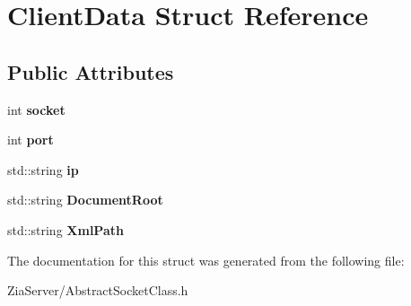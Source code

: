 \hypertarget{struct_client_data}{
\section{ClientData Struct Reference}
\label{struct_client_data}
}
\subsection*{Public Attributes}
\begin{DoxyCompactItemize}
\item 
\hypertarget{struct_client_data_a23b2f90a351ac93b2a3ee559aadc8b9f}{
int {\bfseries socket}}
\label{struct_client_data_a23b2f90a351ac93b2a3ee559aadc8b9f}

\item 
\hypertarget{struct_client_data_a469182d11f1c996e63b47a52ebf04de4}{
int {\bfseries port}}
\label{struct_client_data_a469182d11f1c996e63b47a52ebf04de4}

\item 
\hypertarget{struct_client_data_a918292163843f45e026a74f20e11be35}{
std::string {\bfseries ip}}
\label{struct_client_data_a918292163843f45e026a74f20e11be35}

\item 
\hypertarget{struct_client_data_ac0943d293209a738bcbe836cd64087b7}{
std::string {\bfseries DocumentRoot}}
\label{struct_client_data_ac0943d293209a738bcbe836cd64087b7}

\item 
\hypertarget{struct_client_data_a6bfed9f1c1bcd8931ccc98c5bfc33c53}{
std::string {\bfseries XmlPath}}
\label{struct_client_data_a6bfed9f1c1bcd8931ccc98c5bfc33c53}

\end{DoxyCompactItemize}


The documentation for this struct was generated from the following file:\begin{DoxyCompactItemize}
\item 
ZiaServer/AbstractSocketClass.h\end{DoxyCompactItemize}
